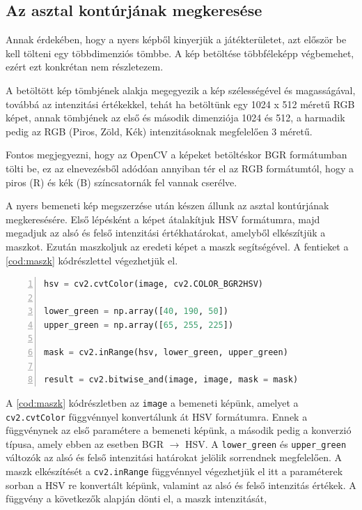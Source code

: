 \subsection{Az asztal kontúrjának megkeresése}
Annak érdekében, hogy a nyers képből kinyerjük a játékterületet, azt először be kell tölteni egy többdimenziós tömbbe. A kép betöltése többféleképp végbemehet, ezért ezt konkrétan nem részletezem.
\par A betöltött kép tömbjének alakja megegyezik a kép szélességével és magasságával, továbbá az intenzitási értékekkel, tehát ha betöltünk egy 1024 x 512 méretű RGB képet, annak tömbjének az első és második dimenziója 1024 és 512, a harmadik pedig az RGB (Piros, Zöld, Kék) intenzitásoknak megfelelően 3 méretű.
\par Fontos megjegyezni, hogy az OpenCV a képeket betöltéskor BGR formátumban tölti be, ez az elnevezésből adódóan annyiban tér el az RGB formátumtól, hogy a piros (R) és kék (B) színcsatornák fel vannak cserélve.
\par A nyers bemeneti kép megszerzése után készen állunk az asztal kontúrjának megkeresésére. Első lépésként a képet átalakítjuk HSV formátumra, majd megadjuk az alsó és felső intenzitási értékhatárokat, amelyből elkészítjük a maszkot. Ezután maszkoljuk az eredeti képet a maszk segítségével.
\newline A fentieket a \ref{cod:maszk} kódrészlettel végezhetjük el.


\vspace{2mm}
\hspace{-10mm}
\begin{minipage}{\linewidth}
\begin{lstlisting}[language=Python, numbers=left, caption={A játékterület maszkolása.}, label={cod:maszk}]
hsv = cv2.cvtColor(image, cv2.COLOR_BGR2HSV)

lower_green = np.array([40, 190, 50])
upper_green = np.array([65, 255, 225])

mask = cv2.inRange(hsv, lower_green, upper_green)

result = cv2.bitwise_and(image, image, mask = mask)
\end{lstlisting}
\end{minipage}

\par A \ref{cod:maszk} kódrészletben az \lstinline{image} a bemeneti képünk, amelyet a \lstinline{cv2.cvtColor} függvénnyel \cite{opencv_docs} konvertálunk át HSV formátumra. Ennek a függvénynek az első paramétere a bemeneti képünk, a második pedig a konverzió típusa, amely ebben az esetben BGR $\rightarrow$ HSV. A \lstinline{lower_green} és \lstinline{upper_green} változók az alsó és felső intenzitási határokat jelölik sorrendnek megfelelően. A maszk elkészítését a \lstinline{cv2.inRange} függvénnyel \cite{opencv_docs} végezhetjük el itt a paraméterek sorban a HSV re konvertált képünk, valamint az alsó és felső intenzitás értékek.
\newline A függvény a következők alapján dönti el, a maszk intenzitását,

